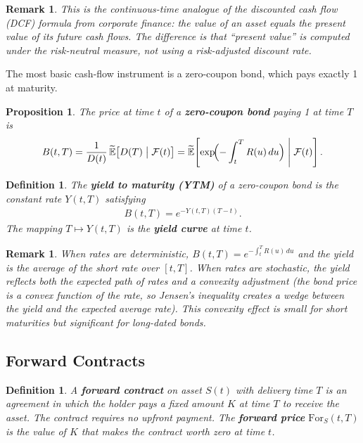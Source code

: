 \documentclass{report}
\theoremstyle{spacedplain}
\newtheorem{proposition}[theorem]{Proposition}
\theoremstyle{spaceddefinition}
\newtheorem{definition}[theorem]{Definition}
\theoremstyle{spacedremark}
\newtheorem{remark}[theorem]{Remark}
\begin{document}
\begin{remark}
This is the continuous-time analogue of the discounted cash flow (DCF) formula from corporate finance: the value of an asset equals the present value of its future cash flows. The difference is that ``present value'' is computed under the risk-neutral measure, not using a risk-adjusted discount rate.
\end{remark}

The most basic cash-flow instrument is a zero-coupon bond, which pays exactly 1 at maturity.

\begin{proposition}
The price at time $t$ of a \textbf{zero-coupon bond} paying 1 at time $T$ is
\begin{align}
    B(t,T) = \frac{1}{D(t)}\,\widetilde{\mathbb{E}}\bigl[D(T)\;\big|\;\mathcal{F}(t)\bigr] = \widetilde{\mathbb{E}}\!\left[\exp\!\Bigl(-\int_t^T R(u)\,du\Bigr)\;\middle|\;\mathcal{F}(t)\right].
\end{align}
\end{proposition}

\begin{definition}
The \textbf{yield to maturity (YTM)} of a zero-coupon bond is the constant rate $Y(t,T)$ satisfying
\begin{align}
    B(t,T) = e^{-Y(t,T)(T-t)}.
\end{align}
The mapping $T \mapsto Y(t,T)$ is the \textbf{yield curve} at time $t$.
\end{definition}

\begin{remark}
When rates are deterministic, $B(t,T) = e^{-\int_t^T R(u)\,du}$ and the yield is the average of the short rate over $[t,T]$. When rates are stochastic, the yield reflects both the expected path of rates and a convexity adjustment (the bond price is a convex function of the rate, so Jensen's inequality creates a wedge between the yield and the expected average rate). This convexity effect is small for short maturities but significant for long-dated bonds.
\end{remark}

\subsection{Forward Contracts}

\begin{definition}
A \textbf{forward contract} on asset $S(t)$ with delivery time $T$ is an agreement in which the holder pays a fixed amount $K$ at time $T$ to receive the asset. The contract requires no upfront payment. The \textbf{forward price} $\text{For}_S(t,T)$ is the value of $K$ that makes the contract worth zero at time $t$.
\end{definition}
\end{document}
